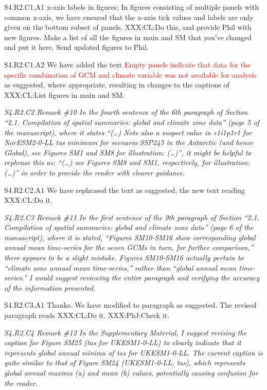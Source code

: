 \documentclass[a4paper,10pt]{article}
\newcommand{\ed}[1]{\textcolor{red}{#1}}
\begin{document}
	S4.R2.C1.A1 x-axis labels in figures: In figures consisting of multiple panels with common x-axis, we have ensured that the x-axis tick values and labels are only given on the bottom subset of panels. XXX:CL:Do this, and provide Phil with new figures. Make a list of all the figures in main and SM that you've changed and put it here. Send updated figures to Phil.
	
	S4.R2.C1.A2 We have added the text \ed{Empty panels indicate that data for the specific combination of GCM and climate variable was not available for analysis} as suggested, where appropriate, resulting in changes to the captions of XXX:CL:List figures in main and SM.

	\emph{S4.R2.C2 Remark \#10 In the fourth sentence of the 6th paragraph of Section “2.1. Compilation of spatial summaries: global and climate zone data” (page 5 of the manuscript), where it states “(…) Note also a suspect value in r1i1p1r1 for NorESM2-0-LL tas minimum for scenario SSP245 in the Antarctic (and hence Global), see Figures SM1 and SM8 for illustration: (…)”, it might be helpful to rephrase this as: “(…) see Figures SM8 and SM1, respectively, for illustration: (…)” in order to provide the reader with clearer guidance.}

	S4.R2.C2.A1 We have rephrased the text as suggested, the new text reading XXX:CL:Do it.

	\emph{S4.R2.C3 Remark \#11 In the first sentence of the 9th paragraph of Section “2.1. Compilation of spatial summaries: global and climate zone data” (page 6 of the manuscript), where it is stated, “Figures SM10-SM16 show corresponding global annual mean time-series for the seven GCMs in turn, for further comparison,” there appears to be a slight mistake. Figures SM10-SM16 actually pertain to “climate zone annual mean time-series,” rather than “global annual mean time-series.” I would suggest reviewing the entire paragraph and verifying the accuracy of the information presented.}

	S4.R2.C3.A1 Thanks. We have modified to paragraph as suggested. The revised paragraph reads XXX:CL:Do it. XXX:PhJ:Check it.

	\emph{S4.R2.C4 Remark \#12 In the Supplementary Material, I suggest revising the caption for Figure SM25 (tas for UKESM1-0-LL) to clearly indicate that it represents global annual minima of tas for UKESM1-0-LL. The current caption is quite similar to that of Figure SM24 (UKESM1-0-LL, tas), which represents global annual maxima (a) and mean (b) values, potentially causing confusion for the reader.}
\end{document}
